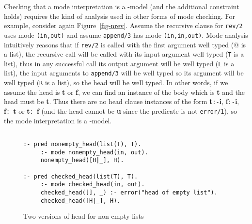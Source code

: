 \documentclass{tlp}
\begin{document}
\noindent
Checking that a mode interpretation is a -model
(and the additional constraint holds)
requires the kind of analysis used in other forms of mode checking.
For example, consider again Figure~\ref{fig-nrev}.
Assume the recursive clause for \texttt{rev/2}
uses mode \texttt{(in,out)} and assume \texttt{append/3} has
mode \texttt{(in,in,out)}.  Mode analysis intuitively reasons that if
\texttt{rev/2} is called with the first argument well typed (\verb@[H|T]@
is a list), the recursive call will be called with its input argument
well typed (\texttt{T} is a list), thus in any successful call its
output argument will be well typed (\texttt{L} is a list), the input
arguments to \texttt{append/3} will be well typed so its argument will
be well typed (\texttt{R} is a list), so the head will be well typed.
In other words, if we assume the head is \textbf{t} or \textbf{f},
we can find an instance of the body which is \textbf{t} and the head
must be \textbf{t}.  Thus there are no head clause instances of the
form \textbf{t}\texttt{:-}\textbf{i}, \textbf{f}\texttt{:-}\textbf{i},
\textbf{f}\texttt{:-}\textbf{t} or \textbf{t}\texttt{:-}\textbf{f}
(and the head cannot be \textbf{u} since the predicate is not 
\texttt{error/1}), 
so the mode interpretation is a -model.

\begin{figure}
\begin{verbatim}

:- pred nonempty_head(list(T), T).
     :- mode nonempty_head(in, out).
     nonempty_head([H|_], H).

:- pred checked_head(list(T), T).
     :- mode checked_head(in, out).
     checked_head([], _) :- error("head of empty list").
     checked_head([H|_], H).
\end{verbatim}
\caption{Two versions of head for non-empty lists\label{fig-head}}
\end{figure}
\end{document}
